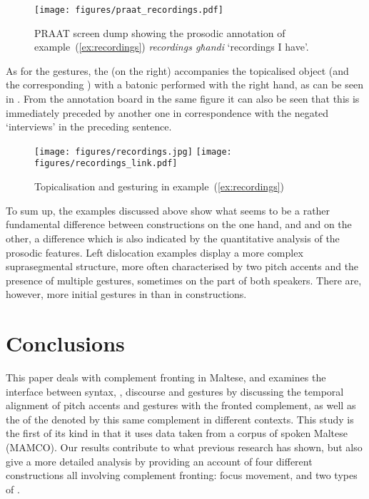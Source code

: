 \documentclass[output=paper]{LSP/langsci}
\begin{document}
\begin{figure}
\texttt{[image: figures/praat\_recordings.pdf]}
\caption{PRAAT screen dump showing the prosodic annotation of
  example~(\ref{ex:recordings}) {\em recordings għandi} `recordings I have'.}
\label{fig:praat_recordings}
\end{figure}

As for the gestures, the  (on the right) accompanies the
topicalised object (and the corresponding ) with a batonic
 performed with the right hand, as can be seen in
.
From the annotation board in the same
figure it can also be seen that this  is immediately preceded
by another one in correspondence with the negated `interviews' in the
preceding sentence.


\begin{figure}
  \texttt{[image: figures/recordings.jpg]}
   \texttt{[image: figures/recordings\_link.pdf]}
   \caption{Topicalisation and gesturing in example~(\ref{ex:recordings})}
\label{fig:recordings}
\end{figure}

To sum up, the examples discussed above show what seems to be a rather
fundamental difference between  constructions on the
one hand, and  and  on the other, a
difference which is also indicated by the quantitative analysis of the
prosodic features. Left dislocation examples display a more complex
suprasegmental structure, more often characterised by two pitch
accents and the presence of multiple gestures, sometimes on the part
of both speakers. There are, however, more initial gestures in
 than in  constructions.

\section{Conclusions}
\label{section:conclusion}

This paper deals with complement fronting in Maltese, and examines the
interface between syntax, , discourse and gestures by discussing the
temporal alignment of pitch accents and gestures with the fronted
complement, as well as the  of the  denoted by
this same complement in different contexts. This study is the first of
its kind in that it uses data taken from a corpus of spoken Maltese
(MAMCO). Our results contribute to what previous research has shown,
but also give a more detailed analysis by providing an account of four
different constructions all involving complement fronting: focus
movement,  and two types of .
\end{document}

